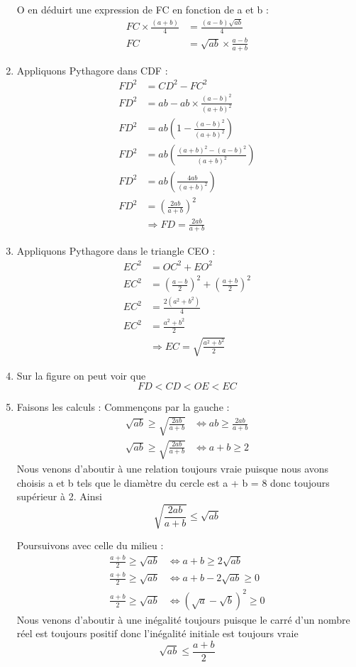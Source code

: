 \documentclass[11pt]{article}
\begin{document}
\begin{enumerate}
O en déduirt une expression de FC en fonction de a et b :
\begin{align*}
	FC\times \frac{(a + b)}{4} &= \frac{(a - b)\sqrt{ab}}{4}\\
	FC &= \sqrt{ab}\times\frac{a - b}{a + b}
\end{align*}
\item Appliquons Pythagore dans CDF : 
\begin{align*}
	FD^2 &= CD^2 - FC^2\\
	FD^2 &= ab - ab \times\frac{(a - b)^2}{(a + b)^2} \\
	FD^2 &= ab\left( 1 - \frac{(a - b)^2}{(a + b)^2}\right) \\
	FD^2 &= ab\left( \frac{(a + b)^2 - (a - b)^2}{(a + b)^2}\right) \\
	FD^2 &= ab\left( \frac{4ab}{(a + b)^2}\right) \\
	FD^2 &= \left(\frac{2ab}{a + b}\right)^2\\
	 &\Rightarrow \boxed{FD = \frac{2ab}{a + b}}
\end{align*}
\item Appliquons Pythagore dans le triangle CEO :
\begin{align*}
	EC^2 &= OC^2 + EO^2 \\
	EC^2 &= \left(\frac{a - b}{2}\right)^2 + \left(\frac{a + b}{2}\right)^2 \\
	EC^2 &= \frac{2(a^2 + b^2)}{4} \\
	EC^2 &= \frac{a^2 + b^2}{2} \\
	&\Rightarrow \boxed{EC = \sqrt{\frac{a^2 + b^2}{2}}}
\end{align*}
\item Sur la figure on peut voir que \[FD < CD < OE < EC\]
\item Faisons les calculs :
Commençons par la gauche : 
\begin{align*}
	\sqrt{ab} \geq \sqrt{\frac{2ab}{a + b}} &\iff ab \geq  \frac{2ab}{a + b} \\
	\sqrt{ab} \geq \sqrt{\frac{2ab}{a + b}} &\iff a + b \geq  2 
\end{align*}
Nous venons d'aboutir à une relation toujours vraie puisque nous avons choisis a et b tels que le diamètre du cercle est a + b = 8 donc toujours supérieur à 2. Ainsi 
\[\boxed{\sqrt{\frac{2ab}{a + b}} \leq \sqrt{ab}}\]

Poursuivons avec celle du milieu : 
\begin{align*}
	\frac{a + b}{2} \geq \sqrt{ab} &\iff a + b \geq 2\sqrt{ab}\\
	\frac{a + b}{2} \geq \sqrt{ab} &\iff a + b - 2\sqrt{ab} \geq 0\\
	\frac{a + b}{2} \geq \sqrt{ab} &\iff (\sqrt{a} - \sqrt{b})^2 \geq 0
\end{align*}
Nous venons d'aboutir à une inégalité toujours puisque le carré d'un nombre réel est toujours positif donc l'inégalité initiale est toujours vraie \[\boxed{\sqrt{ab} \leq \frac{a+b}{2}}\]


\end{enumerate}
\end{document}

